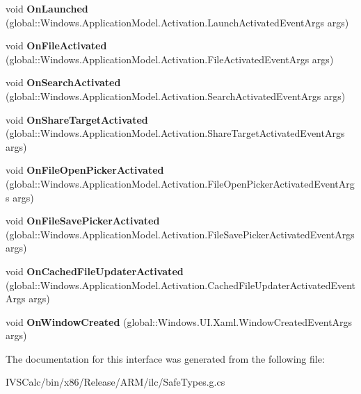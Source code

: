 \begin{DoxyCompactItemize}
void {\bfseries On\+Launched} (global\+::\+Windows.\+Application\+Model.\+Activation.\+Launch\+Activated\+Event\+Args args)
\item 
\mbox{\label{interface_windows_1_1_u_i_1_1_xaml_1_1_i_application_overrides_a9e67cc475338afb3d85b18949e08b15f}} 
void {\bfseries On\+File\+Activated} (global\+::\+Windows.\+Application\+Model.\+Activation.\+File\+Activated\+Event\+Args args)
\item 
\mbox{\label{interface_windows_1_1_u_i_1_1_xaml_1_1_i_application_overrides_aa8ed1fee4ec2b422d17e20f81f1d7c31}} 
void {\bfseries On\+Search\+Activated} (global\+::\+Windows.\+Application\+Model.\+Activation.\+Search\+Activated\+Event\+Args args)
\item 
\mbox{\label{interface_windows_1_1_u_i_1_1_xaml_1_1_i_application_overrides_aae46c198cf7ea67cfcbf175e03b9c9d6}} 
void {\bfseries On\+Share\+Target\+Activated} (global\+::\+Windows.\+Application\+Model.\+Activation.\+Share\+Target\+Activated\+Event\+Args args)
\item 
\mbox{\label{interface_windows_1_1_u_i_1_1_xaml_1_1_i_application_overrides_a9936f8d6d560846bd8afcc2caf52f817}} 
void {\bfseries On\+File\+Open\+Picker\+Activated} (global\+::\+Windows.\+Application\+Model.\+Activation.\+File\+Open\+Picker\+Activated\+Event\+Args args)
\item 
\mbox{\label{interface_windows_1_1_u_i_1_1_xaml_1_1_i_application_overrides_ac1045282cb352835c663f00f47f545c0}} 
void {\bfseries On\+File\+Save\+Picker\+Activated} (global\+::\+Windows.\+Application\+Model.\+Activation.\+File\+Save\+Picker\+Activated\+Event\+Args args)
\item 
\mbox{\label{interface_windows_1_1_u_i_1_1_xaml_1_1_i_application_overrides_ae742ea61ef4a57a981967d42b9269009}} 
void {\bfseries On\+Cached\+File\+Updater\+Activated} (global\+::\+Windows.\+Application\+Model.\+Activation.\+Cached\+File\+Updater\+Activated\+Event\+Args args)
\item 
\mbox{\label{interface_windows_1_1_u_i_1_1_xaml_1_1_i_application_overrides_ae5c60a74b6070b8b620b11c15d8a0d1e}} 
void {\bfseries On\+Window\+Created} (global\+::\+Windows.\+U\+I.\+Xaml.\+Window\+Created\+Event\+Args args)
\end{DoxyCompactItemize}


The documentation for this interface was generated from the following file\+:\begin{DoxyCompactItemize}
\item 
I\+V\+S\+Calc/bin/x86/\+Release/\+A\+R\+M/ilc/Safe\+Types.\+g.\+cs\end{DoxyCompactItemize}
